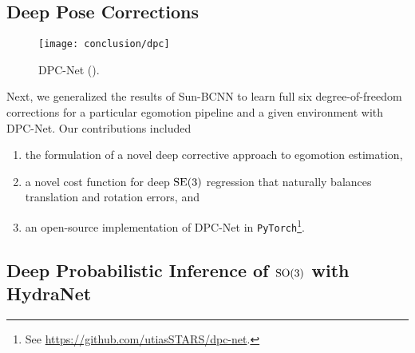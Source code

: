 

\subsection{Deep Pose Corrections}

\begin{wrapfigure}{r}{0.3\textwidth}
  \begin{center}
  	\vspace{-20pt}
    \texttt{[image: conclusion/dpc]}
     \vspace{-15pt}
  \end{center}
  \caption{DPC-Net ().}
  \vspace{-5pt}
\end{wrapfigure}


Next, we generalized the results of Sun-BCNN to learn full six degree-of-freedom corrections for a particular egomotion pipeline and a given environment with DPC-Net. Our contributions included

\begin{enumerate}
	\item the formulation of a novel deep corrective approach to egomotion estimation,
	\item a novel cost function for deep $\mathrm{SE}(3)$ regression that naturally balances translation and rotation errors, and
	\item an open-source implementation of DPC-Net in \texttt{PyTorch}\footnote{See \url{https://github.com/utiasSTARS/dpc-net}.}.
\end{enumerate}



\subsection{Deep Probabilistic Inference of $\mathrm{SO}(3)$ with HydraNet}

